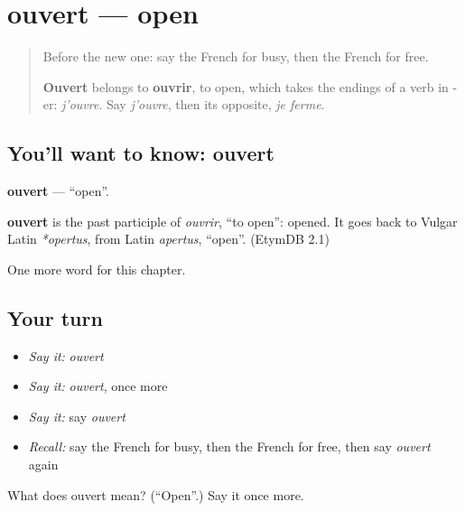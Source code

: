 \section[ouvert]{ouvert — open}

\label{lesson:FR-C131-ouvert}



\begin{quote}
Before the new one: say the French for busy, then the French for free.

\textbf{Ouvert} belongs to \textbf{ouvrir}, to open, which takes the endings of a verb in -er: \emph{j'ouvre}. Say \emph{j'ouvre}, then its opposite, \emph{je ferme}.
\end{quote}

\subsection*{You'll want to know: ouvert}
\textbf{ouvert} — \textquotedblleft{}open\textquotedblright{}.

\begin{cousinweb}
\textbf{ouvert} is the past participle of \emph{ouvrir}, \textquotedblleft{}to open\textquotedblright{}: opened. It goes back to Vulgar Latin \emph{*opertus}, from Latin \emph{apertus}, \textquotedblleft{}open\textquotedblright{}. (EtymDB 2.1)
\end{cousinweb}

\begin{grammarlens}[title={What you've built}]
One more word for this chapter.
\end{grammarlens}

\subsection*{Your turn}
\begin{itemize}
\raggedright
  \item \emph{Say it:} \emph{ouvert}
  \item \emph{Say it:} \emph{ouvert}, once more
  \item \emph{Say it:} say \emph{ouvert}
  \item \emph{Recall:} say the French for busy, then the French for free, then say \emph{ouvert} again
\end{itemize}

\begin{tcolorbox}[breakable,colback=teal!4,colframe=teal!35!black,title={Before you move on}]
What does ouvert mean? (\textquotedblleft{}Open\textquotedblright{}.) Say it once more.
\end{tcolorbox}
